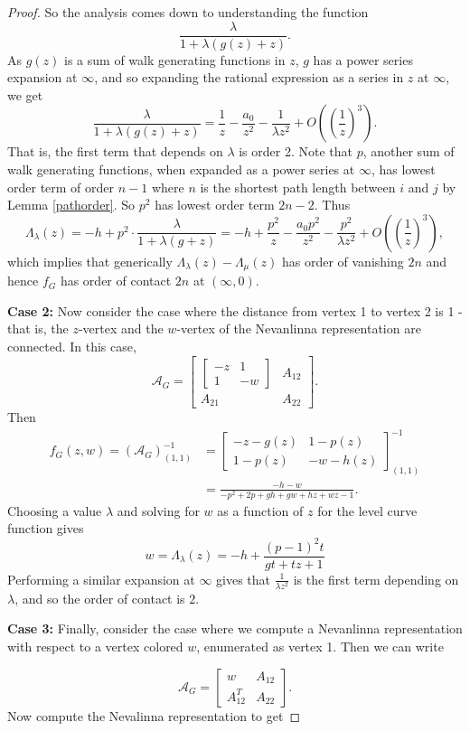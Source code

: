 \documentclass[10pt,a4paper]{amsart}
\newcommand\bbm{\begin{bmatrix}}
\newcommand\ebm{\end{bmatrix}}
\newcommand\la{\lambda}
\newcommand{\A}{\mathcal{A}}
\newcommand{\inv}{^{-1}}
\begin{document}
\begin{proof}
So the analysis comes down to understanding the function
\[
\frac{\la}{1 + \la(g(z) + z)}.
\]
As $g(z)$ is a sum of walk generating functions in $z$, $g$ has a power series expansion at $\infty$, and so expanding the rational expression as a series in $z$ at $\infty$, we get
\[
\frac{\la}{1 + \la(g(z) + z)}  = \frac{1}{z}  - \frac{a_0}{z^2} - \frac{1}{\la z^2}  + O\left(\left(\frac{1}{z}\right)^3\right).
\]
That is, the first term that depends on $\la$ is order 2. Note that $p$, another sum of walk generating functions, when expanded as a power series at $\infty$, has  lowest order term of order $n-1$ where $n$ is the shortest path length between $i$ and $j$ by Lemma \ref{pathorder}. So $p^2$ has lowest order term $2n - 2$. Thus 
\[
\Lambda_\la(z) = -h + p^2 \cdot \frac{\la}{1 + \la(g + z)} = -h + \frac{p^2}{z}  - \frac{a_0 p^2 }{z^2} - \frac{p^2}{\la z^2}  + O\left(\left(\frac{1}{z}\right)^3\right),
\]
which implies that generically $\Lambda_\la(z) - \Lambda_\mu(z)$ has order of vanishing $2n$ and hence $f_G$ has order of contact $2n$ at $(\infty, 0)$. 

\textbf{Case 2:} Now consider the case where the distance from vertex 1 to vertex 2 is 1 - that is, the $z$-vertex and the $w$-vertex of the Nevanlinna representation are connected. In this case, 
\[
\A_G = \bbm \bbm -z & 1 \\ 1 & -w \ebm & A_{12} \\ A_{21} & A_{22} \ebm.
\]
Then
\begin{align*}
f_G(z,w) = (\A_G)\inv_{(1,1)} &= \bbm -z -g(z) & 1-p(z) \\ 1-p(z) & -w - h(z) \ebm\inv_{(1,1)} \\
&= \frac{-h-w}{-p^2+2 p+g h+g w+h z+w z-1}.
\end{align*}
Choosing a value $\la$ and solving for $w$ as a function of $z$ for the level curve function gives
\[
w = \Lambda_\la(z) = -h + \frac{(p-1)^2 t}{g t+t z+1}
\]
Performing a similar expansion at $\infty$ gives that $\frac{1}{\la z^2}$ is the first term depending on $\la$, and so the order of contact is $2$.


\textbf{Case 3:} Finally, consider the case where we compute a Nevanlinna representation with respect to a vertex colored $w$, enumerated as vertex 1. Then we can write
    
\[
    \A_G = \begin{bmatrix}
        w & A_{12} \\
        A_{12}^T & A_{22}
    \end{bmatrix}.
\]
Now compute the Nevalinna representation to get


\end{proof}
\end{document}
